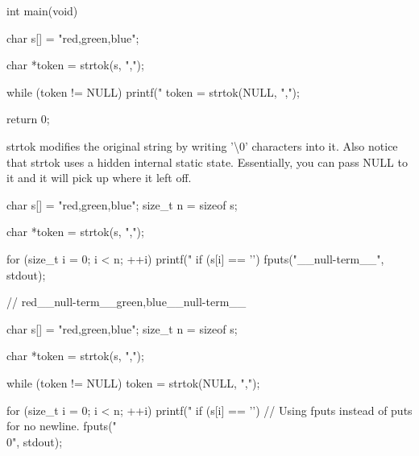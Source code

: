 \documentclass{report}
\begin{document}
\begin{itemize}
\begin{cppcode}
                int main(void) {
                    char s[] = "red,green,blue";

                    char *token = strtok(s, ",");

                    while (token != NULL) {
                        printf("%
                        token = strtok(NULL, ",");
                    }

                    return 0;
                }
            \end{cppcode}
            \bigbreak \noindent 
            strtok modifies the original string by writing '\textbackslash 0' characters into it. Also notice that strtok uses a hidden internal static state. Essentially, you can pass NULL to it and it will pick up where it left off.
            \bigbreak \noindent 
            \begin{cppcode}
                char s[] = "red,green,blue";
                size_t n = sizeof s;

                char *token = strtok(s, ",");

                for (size_t i = 0; i < n; ++i) {
                    printf("%
                    if (s[i] == '\0') {
                        fputs("__null-term__", stdout);
                    }
                }

                // red__null-term__green,blue__null-term__
            \end{cppcode}

            \bigbreak \noindent 
            \begin{cppcode}
                char s[] = "red,green,blue";
                size_t n = sizeof s;

                char *token = strtok(s, ",");

                while (token != NULL) {
                    token = strtok(NULL, ",");
                }

                for (size_t i = 0; i < n; ++i) {
                    printf("%
                    if (s[i] == '\0') {
                        // Using fputs instead of puts for no newline.
                        fputs("\\0", stdout);
                    }
                }


\end{cppcode}
\end{itemize}
\end{document}
